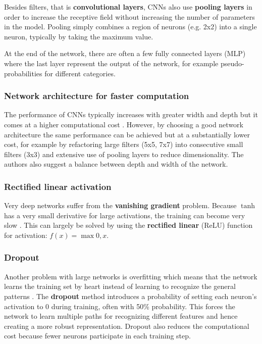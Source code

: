Besides filters, that is \textbf{convolutional layers}, CNNs also use \textbf{pooling layers} in order to increase the receptive field without increasing the number of parameters in the model.
Pooling simply combines a region of neurons (e.g. 2x2) into a single neuron, typically by taking the maximum value.

At the end of the network, there are often a few fully connected layers (MLP) where the last layer represent the output of the network, for example pseudo-probabilities for different categories.

\subsubsection{Network architecture for faster computation}

The performance of CNNs typically increases with greater width and depth but it comes at a higher computational cost \cite{InceptionV3}. However, by choosing a good network architecture the same performance can be achieved but at a substantially lower cost, for example by refactoring large filters (5x5, 7x7) into consecutive small filters (3x3) and extensive use of pooling layers to reduce dimensionality. The authors also suggest a balance between depth and width of the network.


\subsubsection{Rectified linear activation}

Very deep networks suffer from the \textbf{vanishing gradient} problem. Because $\tanh$ has a very small derivative for large activations, the training can become very slow \cite{AlexNet}. This can largely be solved by using the \textbf{rectified linear} (ReLU) function for activation: $f(x) = \max{0, x}$.

\subsubsection{Dropout}

Another problem with large networks is overfitting which means that the network learns the training set by heart instead of learning to recognize the general patterns \cite{AlexNet, FornesCnnCategorization}. The \textbf{dropout} method introduces a probability of setting each neuron's activation to $0$ during training, often with 50\% probability. This forces the network to learn multiple paths for recognizing different features and hence creating a more robust representation. Dropout also reduces the computational cost because fewer neurons participate in each training step.

